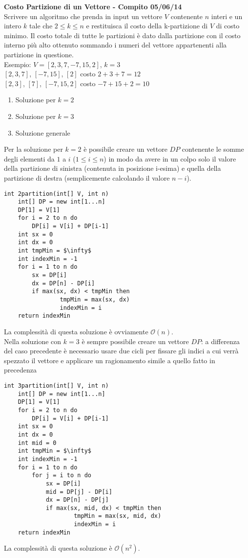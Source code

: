 \documentclass[../cheatSheetAlgoritmi.tex]{subfiles}
\begin{document}
\textbf{Costo Partizione di un Vettore - Compito 05/06/14}\\
Scrivere un algoritmo che prenda in input un vettore $V$ contenente $n$ interi e un intero $k$ tale che $2 \leq k \leq n$ e restituisca il costo della k-partizione di $V$ di costo minimo. Il costo totale di tutte le partizioni è dato dalla partizione con il costo interno più alto ottenuto sommando i numeri del vettore appartenenti alla partizione in questione.\\
Esempio: $V = [2,3,7,-7,15,2]$, $k = 3$\\
$[2,3,7]$, $[-7,15]$, $[2]$ costo $2 + 3 + 7 = 12$\\
$[2,3]$, $[7]$, $[-7,15,2]$	costo $- 7 + 15 + 2 = 10$
\begin{enumerate}
	\item Soluzione per $k= 2$
	\item Soluzione per $k= 3$
	\item Soluzione generale
\end{enumerate}
Per la soluzione per $k = 2$ è possibile creare un vettore $DP$ contenente le somme degli elementi da $1$ a $i$ ($1 \leq i \leq n$) in modo da avere in un colpo solo il valore della partizione di sinistra (contenuta in posizione i-esima) e quella della partizione di destra (semplicemente calcolando il valore $n - i$).
\begin{lstlisting}[caption=2-partizioni]
int 2partition(int[] V, int n)
	int[] DP = new int[1...n]
	DP[1] = V[1]
	for i = 2 to n do
		DP[i] = V[i] + DP[i-1]
	int sx = 0
	int dx = 0
	int tmpMin = $\infty$
	int indexMin = -1
	for i = 1 to n do
		sx = DP[i]
		dx = DP[n] - DP[i]
		if max(sx, dx) < tmpMin then
				tmpMin = max(sx, dx)
				indexMin = i
	return indexMin
\end{lstlisting}
La complessità di questa soluzione è ovviamente $\mathcal{O}(n)$.\\
Nella soluzione con $k=3$ è sempre possibile creare un vettore $DP$: a differenza del caso precedente è necessario usare due cicli per fissare gli indici a cui verrà spezzato il vettore e applicare un ragionamento simile a quello fatto in precedenza
\newpage
\begin{lstlisting}[caption=3-partizioni]
int 3partition(int[] V, int n)
	int[] DP = new int[1...n]
	DP[1] = V[1]
	for i = 2 to n do
		DP[i] = V[i] + DP[i-1]
	int sx = 0
	int dx = 0
	int mid = 0
	int tmpMin = $\infty$
	int indexMin = -1
	for i = 1 to n do
		for j = i to n do
			sx = DP[i]
			mid = DP[j] - DP[i]
			dx = DP[n] - DP[j]
			if max(sx, mid, dx) < tmpMin then
					tmpMin = max(sx, mid, dx)
					indexMin = i
	return indexMin
\end{lstlisting}
La complessità di questa soluzione è $\mathcal{O}(n^{2})$.
\end{document}
